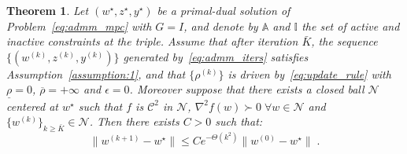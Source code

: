 \documentclass[10pt,a4paper]{amsart}
\newtheorem{theorem}{Theorem}
\begin{document}
\begin{theorem}
\label{thm:superlinear_convergence}
Let $(w^{\star}, z^{\star}, y^{\star})$ be a primal-dual solution of Problem~\eqref{eq:admm_mpc} with $G = I$, and denote by $\mathbb{A}$ and $\mathbb{I}$ the set of active and inactive constraints at the triple. Assume that after iteration $\bar{K}$, the sequence $\{(w^{(k)}, z^{(k)}, y^{(k)})\}$ generated by~\eqref{eq:admm_iters} satisfies Assumption~\ref{assumption:1}, and that $\{\rho^{(k)}\}$ is driven by~\eqref{eq:update_rule} with $\underline{\rho} = 0$, $\overline{\rho} = + \infty$ and $\epsilon=0$. Moreover suppose that there exists a closed ball $\mathcal{N}$ centered at $w^{\star}$ such that $f$ is $\mathcal{C}^2$ in $\mathcal{N}$, $\nabla^2 f(w) \succ 0 \; \forall w \in \mathcal{N}$ and $\{w^{(k)}\}_{k\geq\bar{K}} \in \mathcal{N}$. 
Then there exists $C > 0$ such that:
\begin{equation}
    \|w^{(k+1)} - w^{\star} \| \leq C e^{-\Theta(k^2)} \|w^{(0)} - w^{\star}\| \;.
\end{equation}
\end{theorem}
\end{document}
